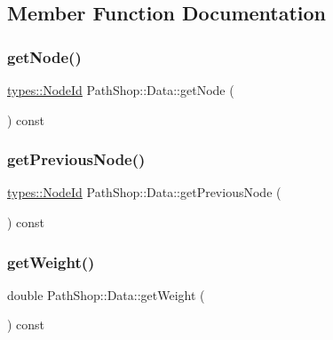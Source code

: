 \subsection{Member Function Documentation}
\mbox{\label{class_path_shop_1_1_data_adcbc8d9a7b74be95e14f57e335efa344}} 
\subsubsection{\texorpdfstring{getNode()}{getNode()}}
{\footnotesize\ttfamily \mbox{\hyperlink{classtypes_1_1_node_id}{types\+::\+Node\+Id}} Path\+Shop\+::\+Data\+::get\+Node (\begin{DoxyParamCaption}{ }\end{DoxyParamCaption}) const\hspace{0.3cm}{\ttfamily [inline]}}

\mbox{\label{class_path_shop_1_1_data_aa6663bf08ea363b72f49bfbcd438615e}} 
\subsubsection{\texorpdfstring{getPreviousNode()}{getPreviousNode()}}
{\footnotesize\ttfamily \mbox{\hyperlink{classtypes_1_1_node_id}{types\+::\+Node\+Id}} Path\+Shop\+::\+Data\+::get\+Previous\+Node (\begin{DoxyParamCaption}{ }\end{DoxyParamCaption}) const\hspace{0.3cm}{\ttfamily [inline]}}

\mbox{\label{class_path_shop_1_1_data_af776565ad2dae76c466c3f0fd020164b}} 
\subsubsection{\texorpdfstring{getWeight()}{getWeight()}}
{\footnotesize\ttfamily double Path\+Shop\+::\+Data\+::get\+Weight (\begin{DoxyParamCaption}{ }\end{DoxyParamCaption}) const\hspace{0.3cm}{\ttfamily [inline]}}

